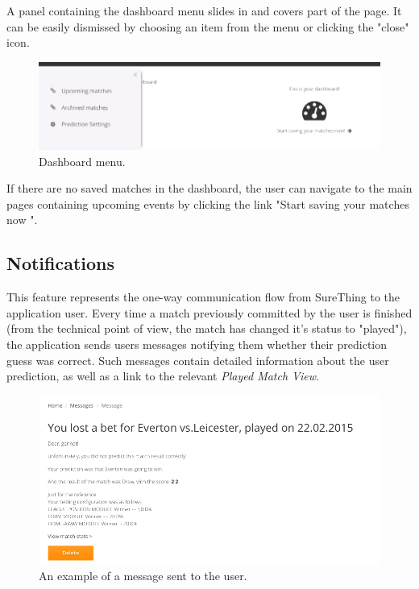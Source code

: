 A panel containing the dashboard menu slides in and covers part of the page. It can be easily dismissed by choosing an item from the menu or clicking the "close" icon.

\begin{figure}[H]
	\begin{center}
		\includegraphics[width=.90\textwidth]{impl/images/dashboardMenu}
		\caption{Dashboard menu.} \label{fig:using: dashboardmenu}
	\end{center}
\end{figure}

If there are no saved matches in the dashboard, the user can navigate to the main pages containing upcoming events by clicking the link "Start saving your matches now ".

\subsection{Notifications}
\label{subsec:notifications}
This feature represents the one-way communication flow from SureThing to the application user. Every time a match previously committed by the user is finished (from the technical point of view, the match has changed it’s status to "played"), the application sends users messages notifying them whether their prediction guess was correct. Such messages contain detailed information about the user prediction, as well as a link to the relevant \emph{Played Match View}.

\begin{figure}[H]
	\begin{center}
		\includegraphics[width=.90\textwidth]{impl/images/message}
		\caption{An example of a message sent to the user.} \label{fig:using: message}
	\end{center}
\end{figure}

